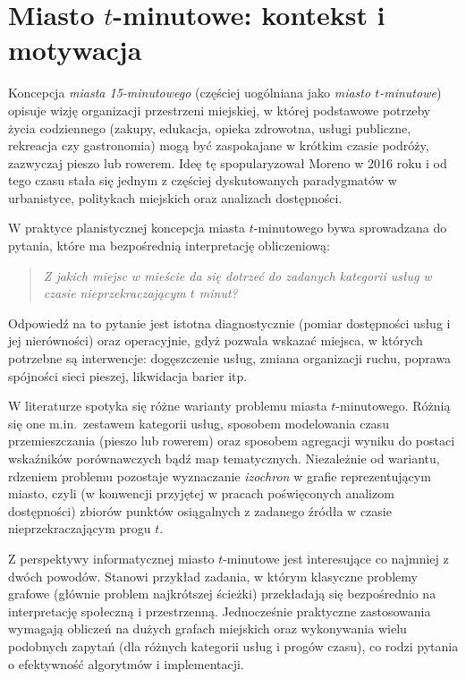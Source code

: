 \label{chap:intro}

\section{Miasto $t$-minutowe: kontekst i motywacja}
\label{sec:intro:kontekst}

Koncepcja \emph{miasta 15-minutowego} (częściej uogólniana jako \emph{miasto $t$-minutowe})
opisuje wizję organizacji przestrzeni miejskiej, w której podstawowe potrzeby życia codziennego
(zakupy, edukacja, opieka zdrowotna, usługi publiczne, rekreacja czy gastronomia)
mogą być zaspokajane w krótkim czasie podróży, zazwyczaj pieszo lub rowerem.
Ideę tę spopularyzował Moreno w 2016 roku \cite{Moreno2016QuartHeure} i od tego czasu
stała się jednym z częściej dyskutowanych paradygmatów w urbanistyce,
politykach miejskich oraz analizach dostępności.

W praktyce planistycznej koncepcja miasta $t$-minutowego bywa sprowadzana do pytania,
które ma bezpośrednią interpretację obliczeniową:
\begin{quote}
\emph{Z jakich miejsc w mieście da się dotrzeć do zadanych kategorii usług w czasie
nieprzekraczającym $t$ minut?}
\end{quote}
Odpowiedź na to pytanie jest istotna diagnostycznie (pomiar dostępności usług i jej nierówności)
oraz operacyjnie, gdyż pozwala wskazać miejsca, w których potrzebne są interwencje:
dogęszczenie usług, zmiana organizacji ruchu, poprawa spójności sieci pieszej, likwidacja barier itp.

W literaturze spotyka się różne warianty problemu miasta $t$-minutowego.
Różnią się one m.in.\ zestawem kategorii usług, sposobem modelowania czasu przemieszczania
(pieszo lub rowerem) oraz sposobem agregacji wyniku do postaci wskaźników porównawczych
bądź map tematycznych. Niezależnie od wariantu, rdzeniem problemu pozostaje wyznaczanie
\emph{izochron} w grafie reprezentującym miasto, czyli (w konwencji przyjętej w pracach
poświęconych analizom dostępności) zbiorów punktów osiągalnych z zadanego źródła w czasie
nieprzekraczającym progu $t$.

\clearpage

Z perspektywy informatycznej miasto $t$-minutowe jest interesujące co najmniej z dwóch powodów.
Stanowi przykład zadania, w którym klasyczne problemy grafowe (głównie problem najkrótszej ścieżki)
przekładają się bezpośrednio na interpretację społeczną i przestrzenną. Jednocześnie praktyczne
zastosowania wymagają obliczeń na dużych grafach miejskich oraz wykonywania wielu podobnych
zapytań (dla różnych kategorii usług i progów czasu), co rodzi pytania o efektywność algorytmów
i implementacji.

